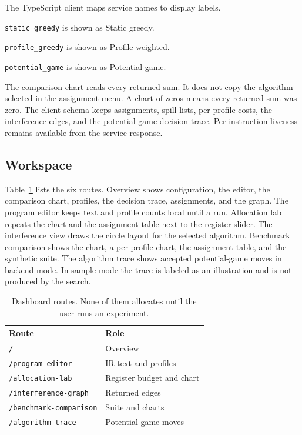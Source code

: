 \documentclass{ieeeaccess}
\begin{document}
The TypeScript client maps service names to display labels.

\texttt{static\_greedy} is shown as Static greedy.

\texttt{profile\_greedy} is shown as Profile-weighted.

\texttt{potential\_game} is shown as Potential game.

The comparison chart reads every returned sum.
It does not copy the algorithm selected in the assignment menu.
A chart of zeros means every returned sum was zero.
The client schema keeps assignments, spill lists, per-profile costs, the interference edges, and the potential-game decision trace.
Per-instruction liveness remains available from the service response.

\subsection{Workspace}
\label{sec:workspace}
Table~\ref{tab:views} lists the six routes.
Overview shows configuration, the editor, the comparison chart, profiles, the decision trace, assignments, and the graph.
The program editor keeps text and profile counts local until a run.
Allocation lab repeats the chart and the assignment table next to the register slider.
The interference view draws the circle layout for the selected algorithm.
Benchmark comparison shows the chart, a per-profile chart, the assignment table, and the synthetic suite.
The algorithm trace shows accepted potential-game moves in backend mode.
In sample mode the trace is labeled as an illustration and is not produced by the search.

\begin{table}[t]
\caption{Dashboard routes. None of them allocates until the user runs an experiment.}
\label{tab:views}
\centering
\begin{tabular}{@{}ll@{}}
\toprule
Route & Role \\
\midrule
\texttt{/} & Overview \\
\texttt{/program-editor} & IR text and profiles \\
\texttt{/allocation-lab} & Register budget and chart \\
\texttt{/interference-graph} & Returned edges \\
\texttt{/benchmark-comparison} & Suite and charts \\
\texttt{/algorithm-trace} & Potential-game moves \\
\bottomrule
\end{tabular}
\end{table}
\end{document}
